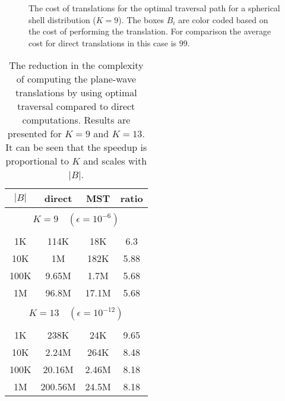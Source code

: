 
\begin{figure}
\centering 	
{}
\caption{The cost of translations for the optimal traversal path for a spherical shell distribution ($K=9$). The boxes $B_i$ are color coded based on the cost of performing the translation. For comparison the average cost for direct translations in this case is $99$.} \label{fig:sphere}
\end{figure}

\begin{table}
\caption{The reduction in the complexity of computing the plane-wave translations by using optimal traversal compared to direct computations. Results are presented for $K=9$ and $K=13$. It can be seen that the speedup is proportional to $K$ and scales with $|B|$.}
\centering
\begin{tabular}{cccc} \hline
        $|B|$  &  direct & MST & ratio \\ \hline       
        \multicolumn{4}{c}{}  \\
        \multicolumn{4}{c}{ {\small $K =  9 \quad (\epsilon = 10^{-6})$}}  \\
        \multicolumn{4}{c}{}  \\
         1K & 114K & 18K & 6.3 \\  
        10K & 1M & 182K & 5.88 \\  
       100K & 9.65M & 1.7M & 5.68 \\  
       1M & 96.8M & 17.1M & 5.68 \\  
       \multicolumn{4}{c}{}  \\
       \multicolumn{4}{c}{ {\small $K =  13 \quad (\epsilon = 10^{-12})$}}  \\
       \multicolumn{4}{c}{}  \\
             1K & 238K & 24K & 9.65 \\  
        10K & 2.24M & 264K & 8.48 \\  
        100K & 20.16M & 2.46M & 8.18 \\  
       1M &   200.56M & 24.5M & 8.18 \\   
\hline
\end{tabular} \label{tab:ratio}
\end{table}

